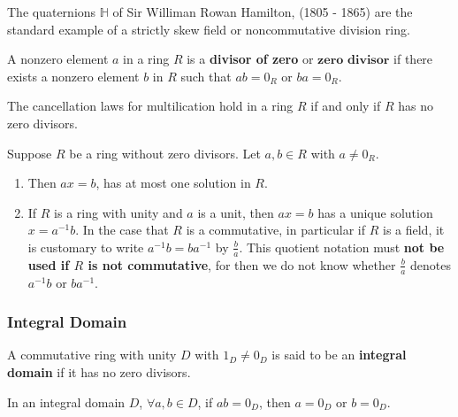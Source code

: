 \begin{remark}
    The quaternions $\mathds{H}$ of Sir Williman Rowan Hamilton, (1805 - 1865) are the standard example of a strictly skew field or noncommutative division ring.
\end{remark}

\begin{definition}
    A nonzero element $a$ in a ring $R$ is a \textbf{divisor of zero} or $\textbf{zero divisor}$ if there exists a nonzero element $b$ in $R$ such that $ab = 0_R$ or $ba = 0_R$.
\end{definition}

\begin{theorem}
    The cancellation laws for multilication hold in a ring $R$ if and only if $R$ has no zero divisors.
\end{theorem}

\begin{remark} Suppose $R$ be a ring without zero divisors. Let  $a, b \in R$ with $a \neq 0_R$.
    
    \begin{enumerate}
        \item Then $ax = b$, has at most one solution in $R$.
        \item If $R$ is a ring with unity and $a$ is a unit, then $ax = b$ has a unique solution $x = a^{-1}b$. In the case that $R$ is a commutative, in particular if $R$ is a field, it is customary to write $a^{-1}b = ba^{-1}$ by $\frac{b}{a}$. This quotient notation must \textbf{not be used if $R$ is not commutative}, for then we do not know whether $\frac{b}{a}$ denotes $a^{-1}b$ or $ba^{-1}$.
    \end{enumerate}
\end{remark}

\subsubsection{Integral Domain}

\begin{definition}
    A commutative ring with unity $D$ with $1_D \neq 0_D$ is said to be an \textbf{integral domain} if it has no zero divisors.
\end{definition}

\begin{remark}
    In an integral domain $D$, $\forall a, b \in D$, if $ab = 0_D$, then $a = 0_D$ or $b = 0_D$.
\end{remark}

